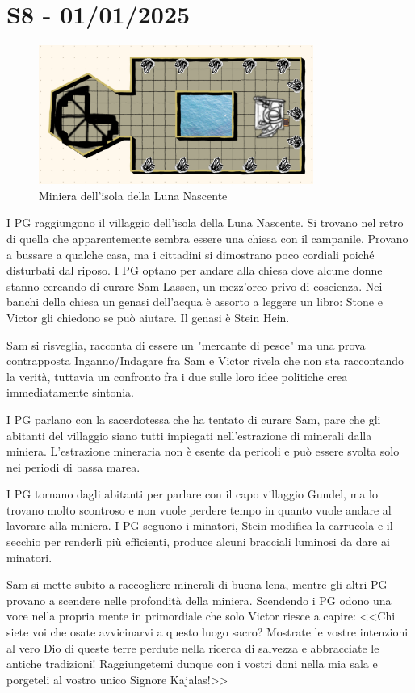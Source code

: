 \documentclass[letterpaper,twocolumn,openany, nodeprecatedcode, nomultitoc]{dndbook}
\begin{document}
\section{S8 - 01/01/2025}
\begin{figure}
\centering
\includegraphics[width=9cm]{./mappe/miniera.png}
\caption{Miniera dell'isola della Luna Nascente}
\label{miniera}
\end{figure}
I PG raggiungono il villaggio dell'isola della Luna Nascente. Si trovano nel retro di quella che apparentemente sembra essere una chiesa con il campanile. Provano a bussare a qualche casa, ma i cittadini si dimostrano poco cordiali poiché disturbati dal riposo. I PG optano per andare alla chiesa dove alcune donne stanno cercando di curare Sam Lassen, un mezz'orco privo di coscienza. Nei banchi della chiesa un genasi dell'acqua è assorto a leggere un libro: Stone e Victor gli chiedono se può aiutare. Il genasi è Stein Hein.

Sam si risveglia, racconta di essere un "mercante di pesce" ma una prova contrapposta Inganno/Indagare fra Sam e Victor rivela che non sta raccontando la verità, tuttavia un confronto fra i due sulle loro idee politiche crea immediatamente sintonia.

I PG parlano con la sacerdotessa che ha tentato di curare Sam, pare che gli abitanti del villaggio siano tutti impiegati nell'estrazione di minerali dalla miniera. L'estrazione mineraria non è esente da pericoli e può essere svolta solo nei periodi di bassa marea.

I PG tornano dagli abitanti per parlare con il capo villaggio Gundel, ma lo trovano molto scontroso e non vuole perdere tempo in quanto vuole andare al lavorare alla miniera. I PG seguono i minatori, Stein modifica la carrucola e il secchio per renderli più efficienti, produce alcuni bracciali luminosi da dare ai minatori.

Sam si mette subito a raccogliere minerali di buona lena, mentre gli altri PG provano a scendere nelle profondità della miniera. Scendendo i PG odono una voce nella propria mente in primordiale che solo Victor riesce a capire: <<Chi siete voi che osate avvicinarvi a questo luogo sacro? Mostrate le vostre intenzioni al vero Dio di queste terre perdute nella ricerca di salvezza e abbracciate le antiche tradizioni! Raggiungetemi dunque con i vostri doni nella mia sala e porgeteli al vostro unico Signore Kajalas!>>
\end{document}
